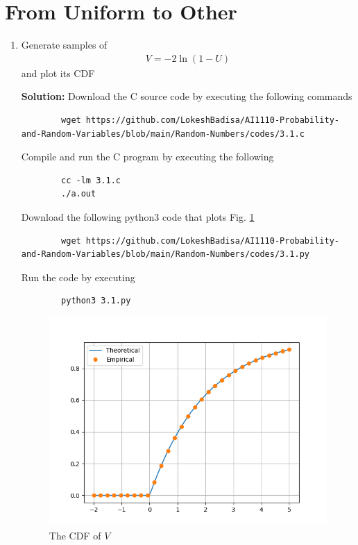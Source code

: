 \documentclass[journal,12pt,twocolumn]{IEEEtran}
\newcommand{\solution}{\noindent \textbf{Solution: }}
\providecommand{\brak}[1]{\ensuremath{\left(#1\right)}}
\numberwithin{equation}{section}
\renewcommand\thesection{\arabic{section}}
\begin{document}
	\section{From Uniform to Other}
	\begin{enumerate}[label=\thesection.\arabic*,ref=\thesection.\theenumi]
	\item Generate samples of 
	\begin{align}
		V = -2\ln\brak{1-U}
	\end{align}
	and plot its CDF
	
	\solution Download the C source code by executing the following commands
	\begin{lstlisting}
		wget https://github.com/LokeshBadisa/AI1110-Probability-and-Random-Variables/blob/main/Random-Numbers/codes/3.1.c
	\end{lstlisting}
	Compile and run the C program by executing the following
	\begin{lstlisting}
		cc -lm 3.1.c
		./a.out
	\end{lstlisting}
	Download the following python3 code that plots Fig. \ref{fig-3.1}
	\begin{lstlisting}
		wget https://github.com/LokeshBadisa/AI1110-Probability-and-Random-Variables/blob/main/Random-Numbers/codes/3.1.py
	\end{lstlisting}
	Run the code by executing
	\begin{lstlisting}
		python3 3.1.py
	\end{lstlisting}
	\begin{figure}
		\centering
		\includegraphics[width=\columnwidth]{./figs/3.1.png}
		\caption{The CDF of $V$}
		\label{fig-3.1}
	\end{figure}	
	

\end{enumerate}
\end{document}
